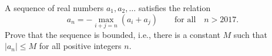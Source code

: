 A sequence of real numbers 
$a_1,a_2,\ldots$
 satisfies the relation
$$a_n=-\max_{i+j=n}(a_i+a_j)\qquad\text{for all}\quad n >2017.$$
Prove that the sequence is bounded, i.e., there is a constant 
$M$
 such that 
$|a_n|\leq M$
 for all positive integers 
$n$.

